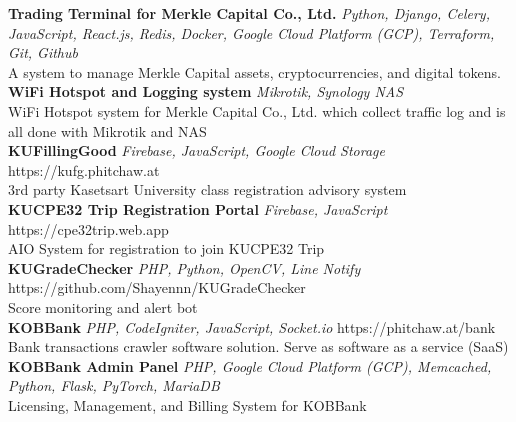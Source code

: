 {\textbf{Trading Terminal for Merkle Capital Co., Ltd.}} {\sl Python, Django, Celery, JavaScript, React.js, Redis, Docker, Google Cloud Platform (GCP), Terraform, Git, Github} \\
A system to manage Merkle Capital assets, cryptocurrencies, and digital tokens.\\
\vspace*{2mm}
{\textbf{WiFi Hotspot and Logging system}} {\sl Mikrotik, Synology NAS} \\
WiFi Hotspot system for Merkle Capital Co., Ltd. which collect traffic log and is all done with Mikrotik and NAS\\
\vspace*{2mm}
{\textbf{KUFillingGood}} {\sl Firebase, JavaScript, Google Cloud Storage} \hfill https://kufg.phitchaw.at\\
3rd party Kasetsart University class registration advisory system\\
\vspace*{2mm}
{\textbf{KUCPE32 Trip Registration Portal}} {\sl Firebase, JavaScript} \hfill https://cpe32trip.web.app\\
AIO System for registration to join KUCPE32 Trip\\
\vspace*{2mm}
{\textbf{KUGradeChecker}} {\sl PHP, Python, OpenCV, Line Notify} \hfill https://github.com/Shayennn/KUGradeChecker\\
Score monitoring and alert bot\\
\vspace*{2mm}
{\textbf{KOBBank}} {\sl PHP, CodeIgniter, JavaScript, Socket.io} \hfill https://phitchaw.at/bank\\
Bank transactions crawler software solution. Serve as software as a service (SaaS)\\
\vspace*{2mm}
{\textbf{KOBBank Admin Panel}} {\sl PHP, Google Cloud Platform (GCP), Memcached, Python, Flask, PyTorch, MariaDB} \\
Licensing, Management, and Billing System for KOBBank\\
\vspace*{2mm}

